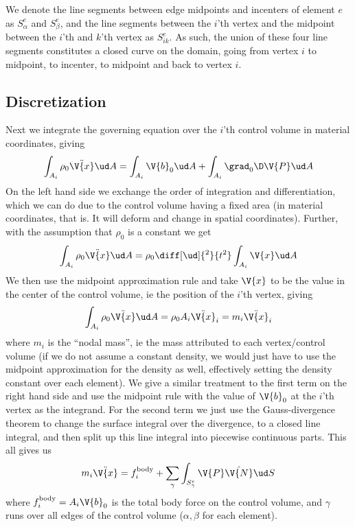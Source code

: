 \documentclass[sigconf]{acmart}
\begin{document}
We denote the line segments between edge midpoints and incenters of element $ e $ as $ S^e_{\alpha} $ and $ S^e_{\beta} $, and the line segments between the $ i $'th vertex and the midpoint between the $ i $'th and $ k $'th vertex as $ S^e_{ik} $. As such, the union of these four line segments constitutes a closed curve on the domain, going from vertex $ i $ to midpoint, to incenter, to midpoint and back to vertex $ i $.


\subsection{Discretization}
Next we integrate the governing equation over the $ i $'th control volume in material coordinates, giving
\begin{equation}\label{key}
	\int_{A_i} \rho_0 \ddot{\V{x}} \ud A = \int_{A_i} \V{b}_0 \ud A + \int_{A_i} \grad_0 \D \V{P} \ud A
\end{equation}
On the left hand side we exchange the order of integration and differentiation, which we can do due to the control volume having a fixed area (in material coordinates, that is. It will deform and change in spatial coordinates). Further, with the assumption that $ \rho_0 $ is a constant we get
\begin{equation}\label{key}
	\int_{A_i} \rho_0 \ddot{\V{x}} \ud A = \rho_0 \diff[\ud]{^2}{t^2}\int_{A_i} \V{x} \ud A
\end{equation}
We then use the midpoint approximation rule and take $ \V{x} $ to be the value in the center of the control volume, ie the position of the $ i $'th vertex, giving
\begin{equation}\label{key}
	\int_{A_i} \rho_0 \ddot{\V{x}} \ud A = \rho_0 A_i \ddot{\V{x}}_i = m_i \ddot{\V{x}}_i
\end{equation}
where $ m_i $ is the ``nodal mass'', ie the mass attributed to each vertex/control volume (if we do not assume a constant density, we would just have to use the midpoint approximation for the density as well, effectively setting the density constant over each element). We give a similar treatment to the first term on the right hand side and use the midpoint rule with the value of $ \V{b}_0 $ at the $ i $'th vertex as the integrand. For the second term we just use the Gauss-divergence theorem to change the surface integral over the divergence, to a closed line integral, and then split up this line integral into piecewise continuous parts. This all gives us
\begin{equation}\label{key}
	m_i \ddot{\V{x}} = f_i^{\text{body}} + \sum_{\gamma} \int_{S^e_{\gamma}}\V{P}\hat{\V{N}} \ud S
\end{equation}
where $ f_i^{\text{body}} =A_i\V{b}_0$ is the total body force on the control volume, and $ \gamma $ runs over all edges of the control volume ($ \alpha, \beta$ for each element).
\end{document}
